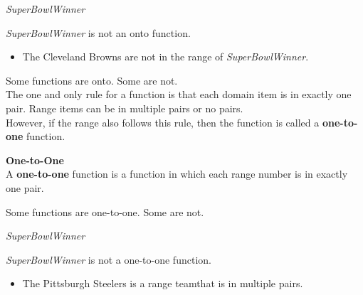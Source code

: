 \documentclass{ximera}
\begin{document}
\begin{example} \textit{SuperBowlWinner}


\textit{SuperBowlWinner} is not an onto function.


\begin{itemize}
\item The Cleveland Browns are not in the range of \textit{SuperBowlWinner}.  
\end{itemize}

\end{example}







Some functions are onto. Some are not. \\




The one and only rule for a function is that each domain item is in exactly one pair.  Range items can be in multiple pairs or no pairs. \\

However, if the range also follows this rule, then the function is called a \textbf{one-to-one} function.



\begin{definition} \textbf{\textcolor{green!50!black}{One-to-One}} \\

A \textbf{one-to-one} function is a function in which each range number is in exactly one pair.

\end{definition}




Some functions are one-to-one. Some are not. \\














\begin{example} \textit{SuperBowlWinner}


\textit{SuperBowlWinner} is not a one-to-one function.


\begin{itemize}
\item The Pittsburgh Steelers is a range teamthat is in multiple pairs. 
\end{itemize}

\end{example}
\end{document}
